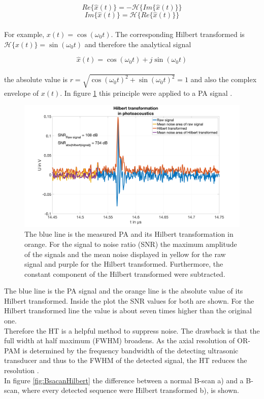 \begin{equation}
	Re\{\hat{x}(t)\} = - \mathcal{H}\{Im\{\hat{x}(t)\}\}
\end{equation}
\begin{equation}
	Im\{\hat{x}(t)\} =  \mathcal{H}\{Re\{\hat{x}(t)\}\}
\end{equation}
\\
For example, $x(t) = \cos(\omega_0 t)$. The corresponding Hilbert transformed is $\mathcal{H}\{x(t)\} = \sin(\omega_0 t)$ and therefore the analytical signal

\begin{equation}
\hat{x}(t) =  \cos(\omega_0 t) + j \sin(\omega_0 t) 
\end{equation}
\\
the absolute value is $r = \sqrt{\cos(\omega_0 t)^2 +  \sin(\omega_0 t)^2} = 1$ and also the complex envelope of $x(t)$. In figure \ref{fig:PAhilbertSim} this principle were applied to a PA signal \cite{book:girodSystemtheorie}.  

\begin{figure}[H]
	\centering		
	\includegraphics[width = \textwidth]{02_principles_of_photoacoustics/images/measHilbertPA.png}
	\caption{The blue line is the measured PA and its Hilbert transformation in orange. For the signal to noise ratio (SNR) the maximum amplitude of the signals and the mean noise displayed in yellow for the raw signal and purple for the Hilbert transformed. Furthermore, the constant component of the Hilbert transformed were subtracted. }
	\label{fig:PAhilbertSim}
\end{figure}

The blue line is the PA signal and the orange line is the absolute value of its Hilbert transformed. Inside the plot the SNR values for both are shown. For the Hilbert transformed line the value is about seven times higher than the original one.\\
Therefore the HT is a helpful method to suppress noise. The drawback is that the full width at half maximum (FWHM) broadens. As the axial resolution of OR-PAM is determined by the frequency bandwidth of the detecting ultrasonic transducer and thus to the FWHM of the detected signal, the HT reduces the resolution \cite{Ma:GRPAMinVivo}.\\ 
In figure \ref{fig:BsacanHilbert} the difference between a normal B-scan a) and a B-scan, where every detected sequence were Hilbert transformed b), is shown.

